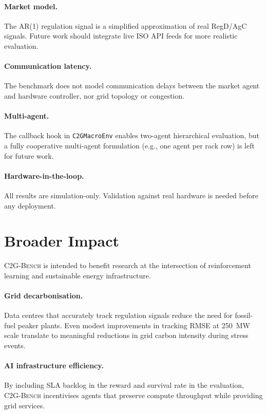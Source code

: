 \documentclass{article}
\newcommand{\cname}{\textsc{C2G-Bench}}
\newcommand{\envhigh}{\texttt{C2GMacroEnv}}
\begin{document}
\paragraph{Market model.}
The AR(1) regulation signal is a simplified approximation of real RegD/AgC
signals. Future work should integrate live ISO API feeds for more realistic
evaluation.

\paragraph{Communication latency.}
The benchmark does not model communication delays between the market agent
and hardware controller, nor grid topology or congestion.

\paragraph{Multi-agent.}
The callback hook in \envhigh{} enables two-agent hierarchical evaluation,
but a fully cooperative multi-agent formulation (e.g., one agent per rack
row) is left for future work.

\paragraph{Hardware-in-the-loop.}
All results are simulation-only. Validation against real hardware is needed
before any deployment.

\section{Broader Impact}
\label{sec:impact}

\cname{} is intended to benefit research at the intersection of reinforcement
learning and sustainable energy infrastructure.

\paragraph{Grid decarbonisation.}
Data centres that accurately track regulation signals reduce the need for
fossil-fuel peaker plants. Even modest improvements in tracking RMSE at
250~MW scale translate to meaningful reductions in grid carbon intensity
during stress events.

\paragraph{AI infrastructure efficiency.}
By including SLA backlog in the reward and survival rate in the evaluation,
\cname{} incentivises agents that preserve compute throughput while providing
grid services.
\end{document}
